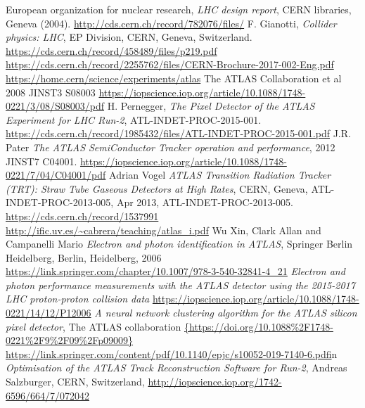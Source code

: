 \documentclass[a4paper, oneside]{book}
\begin{document}
	
	\begin{thebibliography}{10}
			 European organization for nuclear research, \textit{LHC design report}, CERN libraries, Geneva (2004). \url{http://cds.cern.ch/record/782076/files/}
			 F. Gianotti, \textit{Collider physics: LHC}, EP Division, CERN, Geneva, Switzerland. \url{https://cds.cern.ch/record/458489/files/p219.pdf}
			 \url{https://cds.cern.ch/record/2255762/files/CERN-Brochure-2017-002-Eng.pdf}
			 \url{https://home.cern/science/experiments/atlas}
			  The ATLAS Collaboration et al 2008 JINST3 S08003
			\url{https://iopscience.iop.org/article/10.1088/1748-0221/3/08/S08003/pdf}
			 H. Pernegger, \textit{The Pixel Detector of the ATLAS Experiment for LHC Run-2}, ATL-INDET-PROC-2015-001. \url{https://cds.cern.ch/record/1985432/files/ATL-INDET-PROC-2015-001.pdf}
			 J.R. Pater \textit{The ATLAS SemiConductor Tracker operation and performance}, 2012 JINST7 C04001. \url{https://iopscience.iop.org/article/10.1088/1748-0221/7/04/C04001/pdf}
			 Adrian Vogel \textit{ATLAS Transition Radiation Tracker (TRT): Straw Tube Gaseous Detectors at High Rates}, CERN,
			Geneva, ATL-INDET-PROC-2013-005, Apr 2013, ATL-INDET-PROC-2013-005. \url{https://cds.cern.ch/record/1537991}
			\url{http://ific.uv.es/~cabrera/teaching/atlas_i.pdf}
			 Wu Xin, Clark Allan and Campanelli Mario \textit{Electron and photon identification in ATLAS}, Springer Berlin Heidelberg, Berlin, Heidelberg, 2006
			\url{https://link.springer.com/chapter/10.1007/978-3-540-32841-4_21} 
			\textit{Electron and photon performance measurements with the {ATLAS} detector using the 2015-2017 {LHC} proton-proton collision data}
			\url{https://iopscience.iop.org/article/10.1088/1748-0221/14/12/P12006}
			 \textit{A neural network clustering algorithm for the ATLAS silicon pixel detector}, The ATLAS collaboration
			\url{{https://doi.org/10.1088%2F1748-0221%2F9%2F09%2Fp09009}}
			\url{https://link.springer.com/content/pdf/10.1140/epjc/s10052-019-7140-6.pdf}in
			 \textit{Optimisation of the ATLAS Track Reconstruction Software for Run-2}, Andreas Salzburger, CERN, Switzerland, \url{http://iopscience.iop.org/1742-6596/664/7/072042}
	\end{thebibliography}
\end{document}
